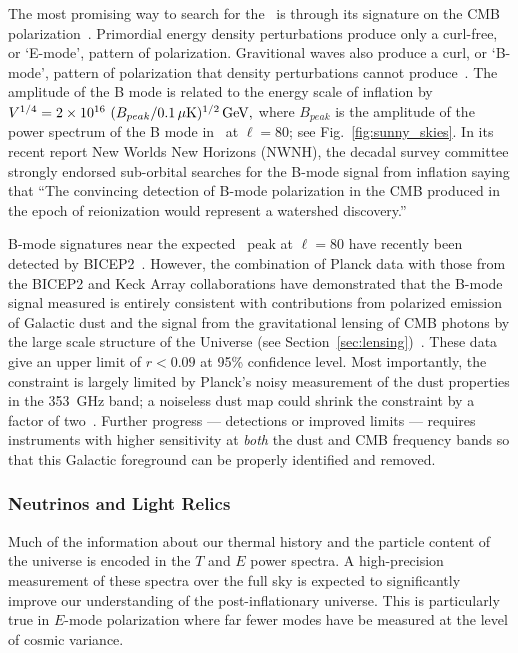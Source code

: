 The most promising way to search for the \igb\ is through its signature on the CMB polarization~\cite{kamionkowski97b,seljak97}.  
Primordial energy density perturbations produce only a curl-free, or `E-mode', pattern of polarization.
Gravitional waves also produce a curl, or `B-mode', pattern of polarization that density perturbations cannot
produce~\cite{kamionkowski97a,zaldarriaga97}.  The amplitude of the B mode is related to the energy scale
of inflation by $V^{1/4}=2\times10^{16} \ ( B_{peak} / 0.1\,\mu{\rm
K})^{1/2} \,{\rm GeV},$ where $B_{peak}$ is the amplitude of the power spectrum of the B mode in \microk\ at $\ell=80$;
see Fig.~\ref{fig:sunny_skies}. In its recent report New Worlds New Horizons (NWNH), the decadal survey 
committee strongly endorsed sub-orbital searches for the B-mode signal from 
inflation saying that ``The convincing detection of B-mode polarization in the CMB produced in the 
epoch of reionization would represent a watershed discovery.''~\cite{blandford2010}

B-mode signatures near the expected \igb\ peak at $\ell=80$ have recently been detected by BICEP2~\cite{bicep2Bmode}. 
However, the combination of Planck data with those from the BICEP2 and Keck Array collaborations have demonstrated 
that the B-mode signal measured is entirely consistent with contributions from polarized emission of Galactic dust and the 
signal from the gravitational lensing of CMB photons by the large scale structure of the Universe (see 
Section~\ref{sec:lensing})~\cite{bkp2015,planck2014-XXX,2016PhRvL.116c1302B}. 
These data give an upper limit of $r<0.09$ at 95\% confidence level.
Most importantly, the constraint is largely limited by Planck's noisy measurement of the dust properties in the 353~GHz band; 
a noiseless dust map could shrink the constraint by a factor of two~\cite{bkp2015}. 
Further progress --- detections or improved limits --- requires instruments 
with higher sensitivity at {\it both} the dust and CMB frequency bands so that this Galactic foreground can be properly identified 
and removed. 

\vspace{-0.22in}

\subsubsection{Neutrinos and Light Relics}

\vspace{-0.05in}

Much of the information about our thermal history and the particle content of the universe is encoded in the $T$ and $E$ power spectra.  
A high-precision measurement of these spectra over the full sky is expected to significantly improve our understanding of the post-inflationary 
universe.  This is particularly true in $E$-mode polarization where far fewer modes have be measured at the level of cosmic variance.   

